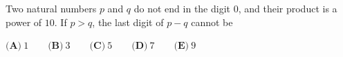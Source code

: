 Two natural numbers $p$ and $q$ do not end in the digit $0$, and their product is a power of $10$. If $p>q$, the last digit of $p-q$ cannot be

$\textbf{(A)}\ 1\qquad\textbf{(B)}\ 3\qquad\textbf{(C)}\ 5\qquad\textbf{(D)}\ 7\qquad\textbf{(E)}\ 9$
